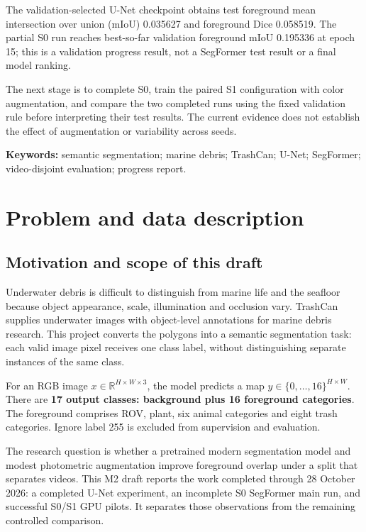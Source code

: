 \documentclass[oneside,final,a4 paper]{hcmut-report}
\begin{document}
The validation-selected U-Net checkpoint obtains test foreground mean intersection over union (mIoU) 0.035627 and foreground Dice 0.058519. The partial S0 run reaches best-so-far validation foreground mIoU 0.195336 at epoch 15; this is a validation progress result, not a SegFormer test result or a final model ranking.

The next stage is to complete S0, train the paired S1 configuration with color augmentation, and compare the two completed runs using the fixed validation rule before interpreting their test results. The current evidence does not establish the effect of augmentation or variability across seeds.

\vspace{0.4 cm}
\textbf{Keywords:} semantic segmentation; marine debris; TrashCan; U-Net; SegFormer; video-disjoint evaluation; progress report.
\clearpage
\tableofcontents
\clearpage
{}
\section{Problem and data description}
\subsection{Motivation and scope of this draft}
Underwater debris is difficult to distinguish from marine life and the seafloor because object appearance, scale, illumination and occlusion vary. TrashCan supplies underwater images with object-level annotations for marine debris research\cite{trashcan}. This project converts the polygons into a semantic segmentation task: each valid image pixel receives one class label, without distinguishing separate instances of the same class.

For an RGB image $x\in\mathbb{R}^{H\times W\times 3}$, the model predicts a map $\hat y\in\{0,\ldots,16\}^{H\times W}$. There are \textbf{17 output classes: background plus 16 foreground categories}. The foreground comprises ROV, plant, six animal categories and eight trash categories. Ignore label 255 is excluded from supervision and evaluation.

The research question is whether a pretrained modern segmentation model and modest photometric augmentation improve foreground overlap under a split that separates videos. This M2 draft reports the work completed through 28 October 2026: a completed U-Net experiment, an incomplete S0 SegFormer main run, and successful S0/S1 GPU pilots. It separates those observations from the remaining controlled comparison.
\end{document}
